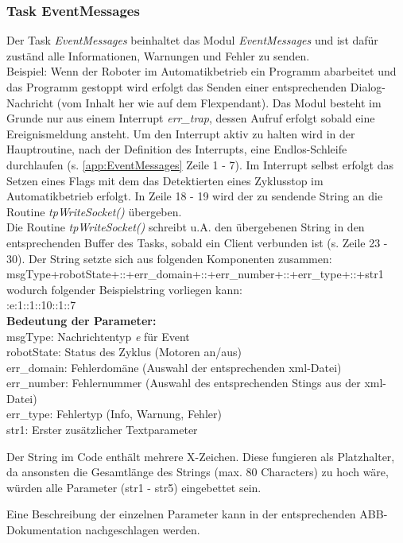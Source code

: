\subsubsection{Task EventMessages}
Der Task \textit{EventMessages} beinhaltet das Modul \textit{EventMessages} und 
ist dafür 
zuständ alle Informationen, Warnungen und Fehler zu senden.\\
Beispiel: Wenn der Roboter im Automatikbetrieb ein Programm abarbeitet und das 
Programm gestoppt wird erfolgt das Senden einer entsprechenden Dialog-Nachricht 
(vom Inhalt her wie auf dem Flexpendant).
Das Modul besteht im Grunde nur aus einem Interrupt \textit{err\_trap}, dessen 
Aufruf erfolgt sobald eine Ereignismeldung ansteht. Um den Interrupt aktiv zu 
halten wird in der Hauptroutine, nach der Definition des Interrupts, eine 
Endlos-Schleife durchlaufen (s. \ref{app:EventMessages} Zeile 1 - 7).
Im Interrupt selbst erfolgt das Setzen eines Flags mit dem das Detektierten 
eines Zyklusstop im Automatikbetrieb erfolgt. In Zeile 18 - 19 wird der zu 
sendende String an die Routine \textit{tpWriteSocket()} übergeben.\\
Die Routine \textit{tpWriteSocket()} schreibt u.A. den übergebenen String in 
den entsprechenden Buffer des Tasks, sobald ein Client verbunden ist (s. Zeile 
23 - 30).
Der String setzte sich aus folgenden Komponenten zusammen:\\
msgType+robotState+::+err\_domain+::+err\_number+::+err\_type+::+str1
wodurch folgender Beispielstring vorliegen kann:\\
:e:1::1::10::1::7\\

\textbf{Bedeutung der Parameter:}\\
msgType: Nachrichtentyp \textit{e} für Event\\
robotState: Status des Zyklus (Motoren an/aus)\\
err\_domain: Fehlerdomäne (Auswahl der entsprechenden xml-Datei)\\
err\_number: Fehlernummer (Auswahl des entsprechenden Stings aus der 
xml-Datei)\\
err\_type: Fehlertyp (Info, Warnung, Fehler)\\
str1: Erster zusätzlicher Textparameter

Der String im Code enthält mehrere X-Zeichen. Diese fungieren als Platzhalter, 
da ansonsten die Gesamtlänge des Strings (max. 80 Characters) zu hoch wäre, 
würden alle Parameter (str1 - str5) eingebettet sein. 

Eine Beschreibung der einzelnen Parameter kann in der entsprechenden 
ABB-Dokumentation nachgeschlagen werden.

